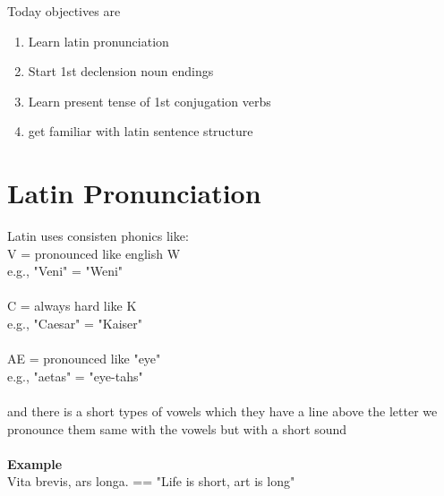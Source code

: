 Today objectives are
\begin{enumerate}
  \item Learn latin pronunciation
  \item Start 1st declension noun endings
  \item Learn present tense of 1st conjugation verbs
  \item get familiar with latin sentence structure
\end{enumerate}
\section*{Latin Pronunciation}
Latin uses consisten phonics like:\\ 
V = pronounced like english W \\ 
e.g., "Veni" = "Weni"\\\\
C = always hard like K \\ 
e.g., "Caesar" = "Kaiser"\\\\
AE = pronounced like "eye"\\ 
e.g., "aetas" = "eye-tahs"\\\\
and there is a short types of vowels which they have a 
line above the letter we pronounce them same with the vowels
but with a short sound \\\\
\large{\textbf{Example}}\\
Vita brevis, ars longa. == "Life is short, art is long"

